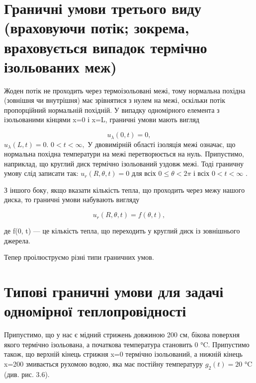 \documentclass[
  ukrainian,
]{article}
\begin{document}
\section{Граничні умови третього виду (враховуючи потік; зокрема,
враховується випадок термічно ізольованих
меж)}\label{ux433ux440ux430ux43dux438ux447ux43dux456-ux443ux43cux43eux432ux438-ux442ux440ux435ux442ux44cux43eux433ux43e-ux432ux438ux434ux443-ux432ux440ux430ux445ux43eux432ux443ux44eux447ux438-ux43fux43eux442ux456ux43a-ux437ux43eux43aux440ux435ux43cux430-ux432ux440ux430ux445ux43eux432ux443ux454ux442ux44cux441ux44f-ux432ux438ux43fux430ux434ux43eux43a-ux442ux435ux440ux43cux456ux447ux43dux43e-ux456ux437ux43eux43bux44cux43eux432ux430ux43dux438ux445-ux43cux435ux436}

Жоден потік не проходить через термоізольовані межі, тому нормальна
похідна (зовнішня чи внутрішня) має зрівнятися з нулем на межі, оскільки
потік пропорційний нормальній похідній. У випадку одномірного елемента з
ізольованими кінцями x=0 і x=L, граничні умови мають вигляд

\[u_{\lambda}(0, t) = 0,\] \(u_{\lambda}(L, t) = 0.\)
\(0 < t < \infty,\) У двовимірній області ізоляція межі означає, що
нормальна похідна температури на межі перетворюється на нуль.
Припустимо, наприклад, що круглий диск термічно ізольований уздовж межі.
Тоді граничну умову слід записати так: \(u_r(R, \theta, t) = 0\) для
всіх \(0 \le \theta < 2\pi\) і всіх \(0 < t < \infty\) .

З іншого боку, якщо вказати кількість тепла, що проходить через межу
нашого диска, то граничні умови набувають вигляду

\[u_r(R, \theta, t) = f(\theta, t),\]

де f(0, t) --- це кількість тепла, що переходить у круглий диск із
зовнішнього джерела.

Тепер проілюструємо різні типи граничних умов.

\section{Типові граничні умови для задачі одномірної
теплопровідності}\label{ux442ux438ux43fux43eux432ux456-ux433ux440ux430ux43dux438ux447ux43dux456-ux443ux43cux43eux432ux438-ux434ux43bux44f-ux437ux430ux434ux430ux447ux456-ux43eux434ux43dux43eux43cux456ux440ux43dux43eux457-ux442ux435ux43fux43bux43eux43fux440ux43eux432ux456ux434ux43dux43eux441ux442ux456}

Припустимо, що у нас є мідний стрижень довжиною 200 см, бікова поверхня
якого термічно ізольована, а початкова температура становить 0 °C.
Припустимо також, що верхній кінець стрижня x=0 термічно ізольований, а
нижній кінець x=200 змивається рухомою водою, яка має постійну
температуру \(g_2(t)=20\) °C (див. рис. 3.6).
\end{document}
